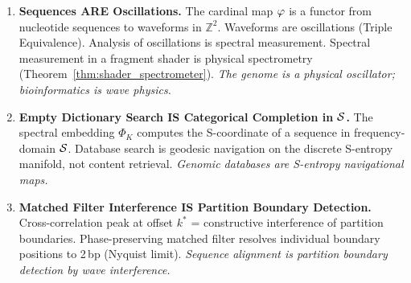 \begin{chapterbox}[title=Chapter 28 --- The Three Identities]
\begin{enumerate}[label=\textbf{\Roman*.}]
  \item \textbf{Sequences ARE Oscillations.} The cardinal map $\varphi$ is a
        functor from nucleotide sequences to waveforms in $\mathbb{Z}^2$.
        Waveforms are oscillations (Triple Equivalence). Analysis of oscillations
        is spectral measurement. Spectral measurement in a fragment shader is
        physical spectrometry (Theorem~\ref{thm:shader_spectrometer}).
        \emph{The genome is a physical oscillator; bioinformatics is wave physics.}

  \item \textbf{Empty Dictionary Search IS Categorical Completion in $\mathcal{S}$.}
        The spectral embedding $\Phi_K$ computes the S-coordinate of a sequence
        in frequency-domain $\mathcal{S}$. Database search is geodesic navigation
        on the discrete S-entropy manifold, not content retrieval.
        \emph{Genomic databases are S-entropy navigational maps.}

  \item \textbf{Matched Filter Interference IS Partition Boundary Detection.}
        Cross-correlation peak at offset $k^*$ = constructive interference of
        partition boundaries. Phase-preserving matched filter resolves individual
        boundary positions to 2\,bp (Nyquist limit).
        \emph{Sequence alignment is partition boundary detection by wave interference.}
\end{enumerate}
\end{chapterbox}
